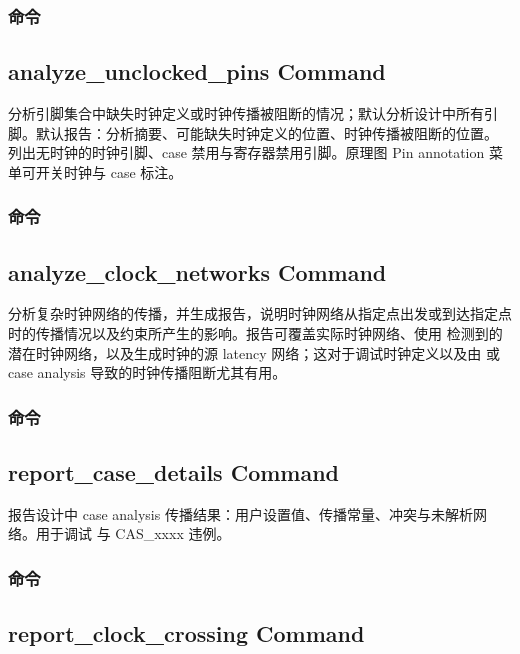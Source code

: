 \subsubsection{ 命令}
\subsection*{analyze\_unclocked\_pins Command}

分析引脚集合中缺失时钟定义或时钟传播被阻断的情况；默认分析设计中所有引脚。默认报告：分析摘要、可能缺失时钟定义的位置、时钟传播被阻断的位置。 列出无时钟的时钟引脚、case 禁用与寄存器禁用引脚。原理图 Pin annotation 菜单可开关时钟与 case 标注。

\subsubsection{ 命令}
\subsection*{analyze\_clock\_networks Command}

分析复杂时钟网络的传播，并生成报告，说明时钟网络从指定点出发或到达指定点时的传播情况以及约束所产生的影响。报告可覆盖实际时钟网络、使用  检测到的潜在时钟网络，以及生成时钟的源 latency 网络；这对于调试时钟定义以及由  或 case analysis 导致的时钟传播阻断尤其有用。

\subsubsection{ 命令}
\subsection*{report\_case\_details Command}

报告设计中 case analysis 传播结果：用户设置值、传播常量、冲突与未解析网络。用于调试  与 CAS\_xxxx 违例。

\subsubsection{ 命令}
\subsection*{report\_clock\_crossing Command}

